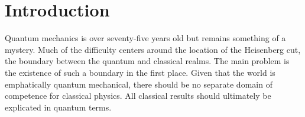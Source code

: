 \documentclass[aps,prl,superscriptaddress,12pt]{revtex4-2}
\begin{document}


\maketitle

\newpage






\section{Introduction}

Quantum mechanics is over seventy-five years old 
	but remains something of a mystery. 
Much of the difficulty centers around the location of the Heisenberg cut, 
	the boundary between the quantum and classical realms. 
The main problem is the existence of such a boundary in the first place. 
Given that the world is emphatically quantum mechanical, 
	there should be no separate domain of competence for classical physics. 
All classical results should ultimately be explicated in quantum terms. 
\end{document}
